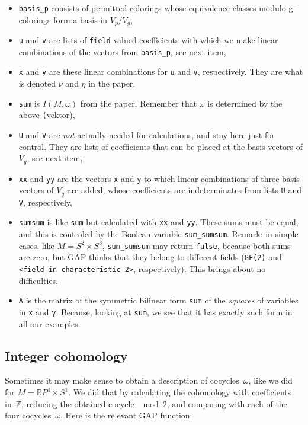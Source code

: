 \documentclass[12pt]{article}
\theoremstyle{definition}
\theoremstyle{remark}
\begin{document}
\begin{itemize}
 \item \texttt{basis\_p} consists of permitted colorings whose equivalence classes modulo g-colorings form a basis in $V_p / V_g$,
 \item \texttt{u} and \texttt{v} are lists of \texttt{field}-valued coefficients with which we make linear combinations of the vectors from \texttt{basis\_p}, see next item,
 \item \texttt{x} and \texttt{y} are these linear combinations for \texttt{u} and \texttt{v}, respectively. They are what is denoted $\nu$ and $\eta$ in the paper,
 \item \texttt{sum} is $I(M,\omega)$ from the paper. Remember that $\omega$ is determined by the above \texttt(vektor),
 \item \texttt{U} and \texttt{V} are \emph{not} actually needed for calculations, and stay here just for control. They are lists of coefficients that can be placed at the basis vectors of $V_g$, see next item,
 \item \texttt{xx} and \texttt{yy} are the vectors \texttt{x} and \texttt{y} to which linear combinations of three basis vectors of $V_g$ are added, whose coefficients are indeterminates from lists \texttt{U} and \texttt{V}, respectively,
 \item \texttt{sumsum} is like \texttt{sum} but calculated with \texttt{xx} and \texttt{yy}. These sums must be equal, and this is controled by the Boolean variable \texttt{sum\_sumsum}. Remark: in simple cases, like $M=S^2\times S^3$, \texttt{sum\_sumsum} may return \texttt{false}, because both sums are zero, but GAP thinks that they belong to different fields (\texttt{GF(2)} and \texttt{<field in characteristic 2>}, respectively). This brings about no difficulties,
 \item \texttt{A} is the matrix of the symmetric bilinear form \texttt{sum} of the \emph{squares} of variables in \texttt{x} and \texttt{y}. Because, looking at \texttt{sum}, we see that it has exactly such form in all our examples.
\end{itemize}

\subsection{Integer cohomology}

Sometimes it may make sense to obtain a description of cocycles~$\omega$, like we did for $M = \mathbb RP^4 \times S^1$. We did that by calculating the cohomology with coefficients in~$\mathbb Z$, reducing the obtained cocycle $\mod 2$, and comparing with each of the four cocycles~$\omega$. Here is the relevant GAP function:
 
\end{document}
